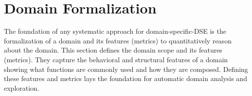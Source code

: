 \section{Domain Formalization}
\label{sec:Domain}

The foundation of any systematic approach for domain-specific-DSE is the formalization of a domain and its features (metrics) to quantitatively reason about the domain. This section defines the domain scope and its features (metrics). They capture the behavioral and structural features of a domain showing what functions are commonly used and how they are composed. Defining these features and metrics lays the foundation for automatic domain analysis and exploration.













